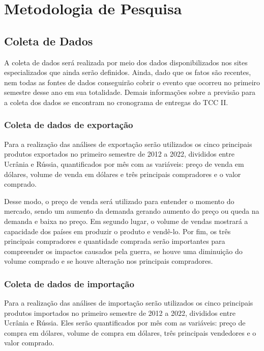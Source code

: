 \documentclass[12pt]{article}
\begin{document}
\section{Metodologia de Pesquisa}

\subsection{Coleta de Dados}
A coleta de dados será realizada por meio dos dados disponibilizados nos sites especializados que ainda serão definidos. Ainda, dado que os fatos são recentes, nem todas as fontes de dados conseguirão cobrir o evento que ocorreu no primeiro semestre desse ano em sua totalidade. Demais informações sobre a previsão para a coleta dos dados se encontram no cronograma de entregas do TCC II.

\subsubsection{Coleta de dados de exportação}

Para a realização das análises de exportação serão utilizados os cinco principais produtos exportados no primeiro semestre de 2012 a 2022, divididos entre Ucrânia e Rússia, quantificados por mês com as variáveis: preço de venda em dólares, volume de venda em dólares e três principais compradores e o valor comprado. 

Desse modo, o preço de venda será utilizado para entender o momento do mercado, sendo um aumento da demanda gerando aumento do preço ou queda na demanda e baixa no preço. Em segundo lugar, o volume de vendas mostrará a capacidade dos países em produzir o produto e vendê-lo. Por fim, os três principais compradores e quantidade comprada serão importantes para compreender os impactos causados pela guerra, se houve uma diminuição do volume comprado e se houve alteração nos principais compradores.

\subsubsection{Coleta de dados de importação}

Para a realização das análises de importação serão utilizados os cinco principais produtos importados no primeiro semestre de 2012 a 2022, divididos entre Ucrânia e Rússia. Eles serão quantificados por mês com as variáveis: preço de compra em dólares, volume de compra em dólares, três principais vendedores e o valor comprado.
\end{document}
